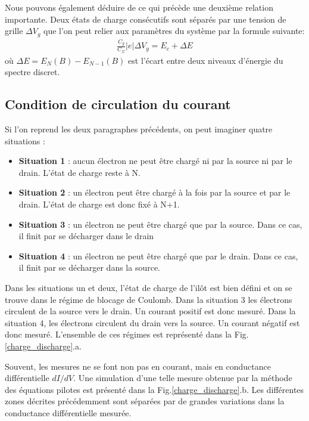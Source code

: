 Nous pouvons également déduire de ce qui précède une deuxième relation importante. Deux états de charge consécutifs sont séparés par une tension de grille $\Delta V_g$ que l'on peut relier aux paramètres du système par la formule suivante:
\begin{eqnarray}
\frac{C_g}{C_{\Sigma}} |e| \Delta V_g = E_c + \Delta E
\end{eqnarray}
où $\Delta E = E_N(B) - E_{N-1}(B)$ est l'écart entre deux niveaux d'énergie du spectre discret.
\subsection{Condition de circulation du courant}

Si l'on reprend les deux paragraphes précédents, on peut imaginer quatre situations :
\begin{itemize}
\item \textbf{Situation 1} : aucun électron ne peut \^etre chargé ni par la source ni par le drain. L'état de charge reste à N.
\item \textbf{Situation 2} : un électron peut \^etre chargé à la fois par la source et par le drain. L'état de charge est donc fixé à N+1.
\item \textbf{Situation 3} : un électron ne peut \^etre chargé que par la source. Dans ce cas, il finit par se décharger dans le drain
\item \textbf{Situation 4} : un électron ne peut \^etre chargé que par le drain. Dans ce cas, il finit par se décharger dans la source. \newline
\end{itemize}

Dans les situations un et deux, l'état de charge de l'il\^ot est bien défini et on se trouve dans le régime de blocage de Coulomb. Dans la situation 3 les électrons circulent de la source vers le drain. Un courant positif est donc mesuré. Dans la situation 4, les électrons circulent du drain vers la source. Un courant négatif est donc mesuré. L'ensemble de ces régimes est représenté dans la Fig. \ref{charge_discharge}.a. 

Souvent, les mesures ne se font non pas en courant, mais en conductance différentielle $dI/dV$. Une simulation d'une telle mesure obtenue par la méthode des équations pilotes est présenté dans la  Fig.\ref{charge_discharge}.b. Les différentes zones décrites précédemment sont séparées par de grandes variations dans la conductance différentielle mesurée.\newline


